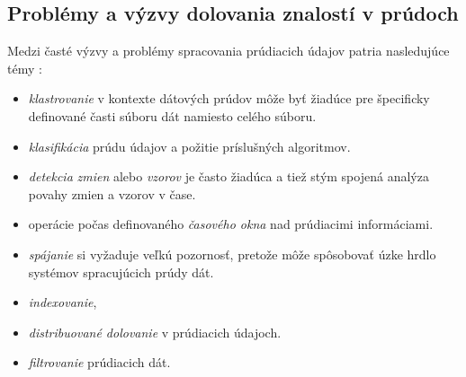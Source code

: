 
\newpage
\subsection{Problémy a výzvy dolovania znalostí v prúdoch}
Medzi časté výzvy a problémy spracovania prúdiacich údajov patria nasledujúce témy \citep{aggarwal2007data,hwang2005high}:
\begin{itemize}
	\item \textit{klastrovanie} v kontexte dátových prúdov môže byť žiadúce pre špecificky definované časti súboru dát namiesto celého súboru.
	\item \textit{klasifikácia} prúdu údajov a požitie príslušných algoritmov.
	\item \textit{detekcia} \textit{zmien} alebo \textit{vzorov} je často žiadúca a tiež stým spojená analýza povahy zmien a vzorov v čase.
	\item operácie počas definovaného \textit{časového okna} nad prúdiacimi informáciami.
	\item \textit{spájanie} si vyžaduje veľkú pozornosť, pretože môže spôsobovať úzke hrdlo systémov spracujúcich prúdy dát.
	\item \textit{indexovanie},
	\item \textit{distribuované dolovanie} v prúdiacich údajoch.
	\item \textit{filtrovanie} prúdiacich dát.
\end{itemize} 































